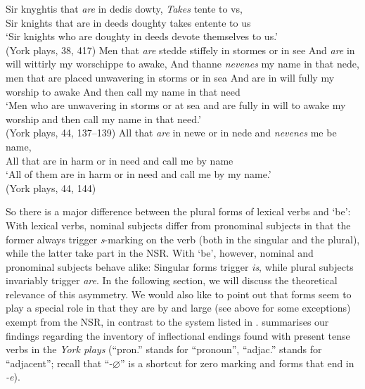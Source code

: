 \documentclass[output=paper]{langsci/langscibook}
\begin{document}
\ea
\label{rule-be}
\ea \gll Sir knyghtis that \textit{are} in dedis dowty, \textit{Takes} tente to vs,\\
Sir knights that are in deeds doughty takes entente to us\\
\glt `Sir knights who are doughty in deeds devote themselves to us.'\\
(York plays, 38, 417)
\ex \gll Men that \textit{are} stedde stiffely in stormes or in see And \textit{are} in will wittirly my worschippe to awake, And thanne \textit{nevenes} my name in that nede, \\
men that are placed unwavering in storms or in sea And are in will fully my worship to awake And then call my name in that need \\
\glt `Men who are unwavering in storms or at sea and are fully in will to awake my worship and then call my name in that need.' \\
(York plays, 44, 137--139)
\ex \gll All that \textit{are} in newe or in nede and \textit{nevenes} me be name,\\
All that are in harm or in need and call me by name\\
\glt `All of them are in harm or in need and call me by my name.'\\
(York plays, 44, 144)
\z
\z

So there is a major difference between the plural forms of lexical verbs and
`be': With lexical verbs, nominal subjects differ from pronominal subjects in
that the former always trigger \emph{s}-marking on the verb (both in the
singular and the plural), while the latter take part in the \gls{NSR}. With
`be', however, nominal and pronominal subjects behave alike: Singular forms
trigger \emph{is}, while plural subjects invariably trigger \emph{are}. In the
following section, we will discuss the theoretical relevance of this asymmetry.
We would also like to point out that \Fsg{} forms seem to play a special role
in that they are by and large (see above for some exceptions) exempt from the
\gls{NSR}, in contrast to the system listed in .
 summarises our findings regarding the inventory of inflectional
endings found with present tense verbs in the \emph{York plays} (``pron.'' stands
for ``pronoun'', ``adjac.'' stands for ``adjacent''; recall that
``-$\varnothing$'' is a shortcut
for zero marking and forms that end in \emph{-e}).
\end{document}
